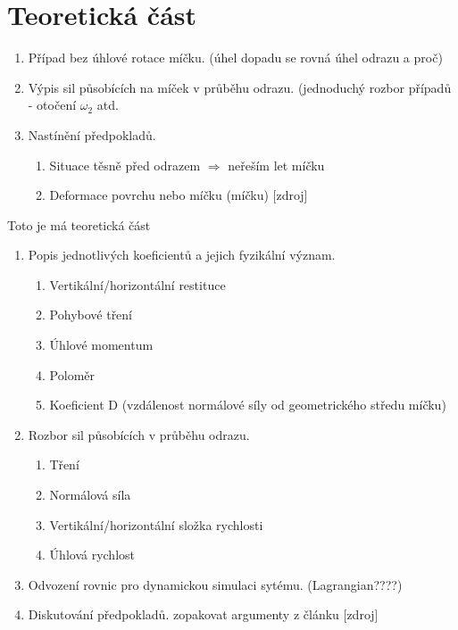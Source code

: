 \part{Teoretická část}


\begin{enumerate}
 \item Případ bez úhlové rotace míčku. (úhel dopadu se rovná úhel odrazu a proč)
 \item Výpis sil působících na míček v průběhu odrazu. (jednoduchý rozbor
  případů - otočení $\omega_2$ atd.
 \item Nastínění předpokladů.
 \begin{enumerate}
  \item Situace těsně před odrazem $ \Rightarrow $ neřeším let míčku
  \item Deformace povrchu nebo míčku (míčku) [zdroj]
 \end{enumerate}
\end{enumerate}


\label{part:teoreticka-cast}
Toto je má teoretická část
\begin{enumerate}
\item Popis jednotlivých koeficientů a jejich fyzikální význam.
 \begin{enumerate}
  \item Vertikální/horizontální restituce
  \item Pohybové tření
  \item Úhlové momentum
  \item Poloměr
  \item Koeficient D (vzdálenost normálové síly od geometrického středu míčku)
 \end{enumerate}
 \item Rozbor sil působících v průběhu odrazu.
 \begin{enumerate}
  \item Tření
  \item Normálová síla
  \item Vertikální/horizontální složka rychlosti
  \item Úhlová rychlost
 \end{enumerate} 
 \item Odvození rovnic pro dynamickou simulaci sytému. (Lagrangian????)
 \item Diskutování předpokladů. zopakovat argumenty z článku [zdroj]
\end{enumerate}


